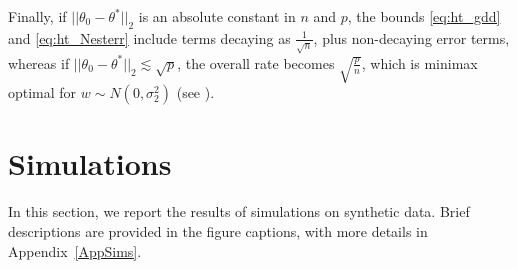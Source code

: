 \documentclass{article}
\begin{document}
Finally, if $||\theta_0 - \theta^*||_2$ is an absolute constant in $n$ and $p$, the bounds \eqref{eq:ht_gdd} and \eqref{eq:ht_Nesterr} include terms decaying as $\frac{1}{\sqrt{n}}$, plus non-decaying error terms, whereas if $||\theta_0 - \theta^*||_2 \lesssim \sqrt{p}$, the overall rate becomes $\sqrt{\frac{p}{n}}$, which is minimax optimal for $w \sim N\left(0, \sigma_2^2\right)$ (see \cite{Stats_Info_Duchi}).


\section{Simulations}
\label{SecSims}

In this section, we report the results of simulations on synthetic data. Brief descriptions are provided in the figure captions, with more details in Appendix~\ref{AppSims}.



\end{document}
